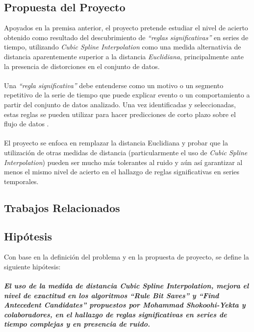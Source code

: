 \subsection{Propuesta del Proyecto}
Apoyados en la premisa anterior, el proyecto pretende estudiar el nivel de acierto obtenido como resultado del descubrimiento de \textit{\enquote{reglas significativas}} en series de tiempo, utilizando \textit{Cubic Spline Interpolation} como una medida alternativia de distancia aparentemente superior a la distancia \textit{Euclidiana}, principalmente ante la presencia de distorciones en el conjunto de datos.\\\\
Una \textit{\enquote{regla significativa}} debe entenderse como un motivo o un segmento repetitivo de la serie de tiempo que puede explicar evento o un comportamiento a partir del conjunto de datos analizado. Una vez identificadas y seleccionadas, estas reglas se pueden utilizar para hacer predicciones de corto plazo sobre el flujo de datos \cite{main}.\\\\
El proyecto se enfoca en remplazar la distancia Euclidiana y probar que la utilizaci\'on de otras medidas de distancia (particularmente el uso de \textit{Cubic Spline Interpolation}) pueden ser mucho m\'as tolerantes al ruido y a\'un as\'i garantizar al menos el mismo nivel de acierto en el hallazgo de reglas significativas en series temporales.
\subsection{Trabajos Relacionados}
\subsection{Hip\'otesis}
Con base en la definici\'on del problema y en la propuesta de proyecto, se define la siguiente hip\'otesis:\\\\
\textbf{\textit{El uso de la medida de distancia \textit{Cubic Spline Interpolation}, mejora el nivel de exactitud en los algoritmos \textit{\textbf{\enquote{Rule Bit Saves}}} y \textit{\textbf{\enquote{Find Antecedent Candidates}}} propuestos por Mohammad Shokoohi-Yekta y colaboradores, en el hallazgo de reglas significativas en series de tiempo complejas y en presencia de ruido.}} 
